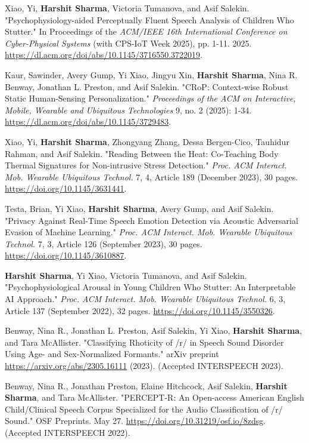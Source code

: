 \documentclass[a4paper,11pt]{article}
\begin{document}
\begin{bibenum}
\item Xiao, Yi, \textbf{Harshit Sharma}, Victoria Tumanova, and Asif Salekin. "Psychophysiology-aided Perceptually Fluent Speech Analysis of Children Who Stutter." In Proceedings of the \emph{ACM/IEEE 16th International Conference on Cyber-Physical Systems} (with CPS-IoT Week 2025), pp. 1-11. 2025. \url{https://dl.acm.org/doi/abs/10.1145/3716550.3722019}.

\item Kaur, Sawinder, Avery Gump, Yi Xiao, Jingyu Xin, \textbf{Harshit Sharma}, Nina R. Benway, Jonathan L. Preston, and Asif Salekin. "CRoP: Context-wise Robust Static Human-Sensing Personalization." \emph{Proceedings of the ACM on Interactive, Mobile, Wearable and Ubiquitous Technologies} 9, no. 2 (2025): 1-34. \url{https://dl.acm.org/doi/abs/10.1145/3729483}.

\item Xiao, Yi, \textbf{Harshit Sharma}, Zhongyang Zhang, Dessa Bergen-Cico, Tauhidur Rahman, and Asif Salekin. "Reading Between the Heat: Co-Teaching Body Thermal Signatures for Non-intrusive Stress Detection." \emph{Proc. ACM Interact. Mob. Wearable Ubiquitous Technol.} 7, 4, Article 189 (December 2023), 30 pages. \url{https://doi.org/10.1145/3631441}.

\item Testa, Brian, Yi Xiao, \textbf{Harshit Sharma}, Avery Gump, and Asif Salekin. "Privacy Against Real-Time Speech Emotion Detection via Acoustic Adversarial Evasion of Machine Learning." \emph{Proc. ACM Interact. Mob. Wearable Ubiquitous Technol.} 7, 3, Article 126 (September 2023), 30 pages. \url{https://doi.org/10.1145/3610887}.

\item \textbf{Harshit Sharma}, Yi Xiao, Victoria Tumanova, and Asif Salekin. "Psychophysiological Arousal in Young Children Who Stutter: An Interpretable AI Approach." \emph{Proc. ACM Interact. Mob. Wearable Ubiquitous Technol.} 6, 3, Article 137 (September 2022), 32 pages. \url{https://doi.org/10.1145/3550326}.

\item Benway, Nina R., Jonathan L. Preston, Asif Salekin, Yi Xiao, \textbf{Harshit Sharma}, and Tara McAllister. "Classifying Rhoticity of /r/ in Speech Sound Disorder Using Age- and Sex-Normalized Formants." arXiv preprint \url{https://arxiv.org/abs/2305.16111} (2023). (Accepted INTERSPEECH 2023).

\item Benway, Nina R., Jonathan Preston, Elaine Hitchcock, Asif Salekin, \textbf{Harshit Sharma}, and Tara McAllister. "PERCEPT-R: An Open-access American English Child/Clinical Speech Corpus Specialized for the Audio Classification of /r/ Sound." OSF Preprints. May 27. \url{https://doi.org/10.31219/osf.io/8zdsg}. (Accepted INTERSPEECH 2022).


\end{bibenum}
\end{document}

